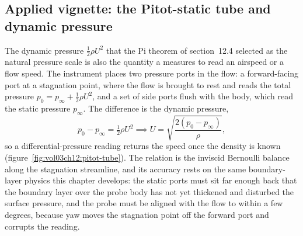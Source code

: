 

\subsection*{Applied vignette: the Pitot-static tube and dynamic pressure}

The dynamic pressure $\tfrac12\rho U^2$ that the Pi theorem of
section~12.4 selected as the natural pressure scale is also the
quantity a  measures to read an airspeed or
a flow speed. The instrument places two pressure ports in the flow: a
forward-facing port at a stagnation point, where the flow is brought to
rest and reads the total pressure $p_0 = p_\infty + \tfrac12\rho
U^2$, and a set of side ports flush with the body, which read the
static pressure $p_\infty$. The difference is the dynamic pressure,
\[
p_0 - p_\infty = \tfrac12\rho U^2 \implies U = \sqrt{\frac{2(p_0 -
p_\infty)}{\rho}},
\]
so a differential-pressure reading returns the speed once the density
is known (figure~\ref{fig:vol03ch12:pitot-tube}). The relation is the
inviscid Bernoulli balance along the stagnation streamline, and its
accuracy rests on the same boundary-layer physics this chapter
develops: the static ports must sit far enough back that the boundary
layer over the probe body has not yet thickened and disturbed the
surface pressure, and the probe must be aligned with the flow to within
a few degrees, because yaw moves the stagnation point off the forward
port and corrupts the reading.

